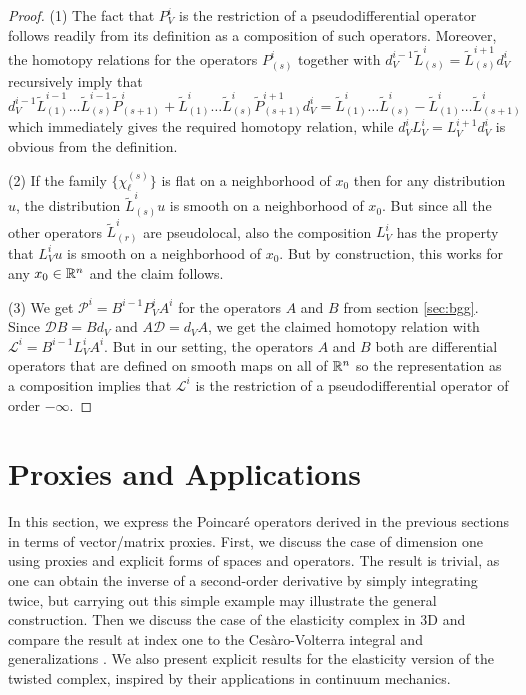 \documentclass[11pt]{amsart}
\newcommand{\0}{\mathaccent23}
\begin{document}
  \begin{proof}
    (1) The fact that $P^i_V$ is the restriction of a pseudodifferential operator follows readily from its definition as a composition of such operators. Moreover, the homotopy relations for the operators $P^i_{(s)}$ together with $d_V^{i-1}\tilde L^i_{(s)}=\tilde L^{i+1}_{(s)}d_V^i$ recursively imply that
    $$
    d^{i-1}_V\tilde L^{i-1}_{(1)}\dots \tilde L^{i-1}_{(s)}\tilde P^i_{(s+1)}+\tilde L^i_{(1)}\dots \tilde L^i_{(s)}\tilde P^{i+1}_{(s+1)}d_V^i=\tilde L^i_{(1)}\dots \tilde L^i_{(s)}-\tilde L^i_{(1)}\dots \tilde L^i_{(s+1)}
    $$
    which immediately gives the required homotopy relation, while  $d^i_VL^i_V=L^{i+1}_Vd_V^i$ is obvious from the definition.

    (2) If the family $\{\chi_\ell^{(s)}\}$ is flat on a neighborhood of $x_0$ then for any distribution $u$, the distribution $\tilde L^i_{(s)}u$ is smooth on a neighborhood of $x_0$. But since all the other operators $\tilde L^i_{(r)}$ are pseudolocal, also the composition $L^i_V$ has the property that $L^i_Vu$ is smooth on a neighborhood of $x_0$. But by construction, this works for any $x_0\in\Bbb R^n$ and the claim follows.

    (3) We get $\mathscr{P}^i=B^{i-1}P^i_VA^i$ for the operators $A$ and $B$ from section \ref{sec:bgg}. Since $\mathscr{D}B=Bd_V$ and $A\mathscr{D}=d_VA$, we get the claimed homotopy relation with $\mathscr{L}^i=B^{i-1}L^i_VA^i$. But in our setting, the operators $A$ and $B$ both are differential operators that are defined on smooth maps on all of $\Bbb R^n$ so the representation as a composition implies that $\mathscr{L}^i$ is the restriction of a pseudodifferential operator of order $-\infty$. 
  \end{proof}

 
\section{Proxies and Applications}\label{sec:applications}

In this section, we express the Poincar\'e operators derived in the previous sections in terms of vector/matrix proxies. First, we discuss the case of dimension one using proxies and explicit forms of spaces and operators. The result is trivial, as one can obtain the inverse of a second-order derivative by simply integrating twice, but carrying out this simple example may illustrate the general construction. Then we discuss the case of the elasticity complex in 3D and compare the result at index one to the Ces\`aro-Volterra integral and generalizations \cite{ciarlet2010cesaro}. We also present explicit results for the elasticity version of the twisted complex, inspired by their applications in continuum mechanics. 
\end{document}
